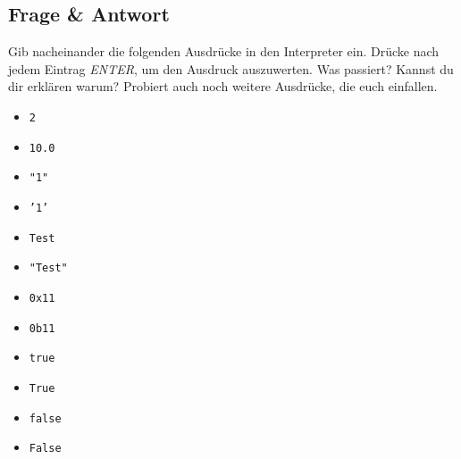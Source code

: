 \subsection{Frage \& Antwort}

Gib nacheinander die folgenden Ausdrücke in den Interpreter ein. Drücke nach
jedem Eintrag \textit{ENTER}, um den Ausdruck auszuwerten. Was passiert?
Kannst du dir erklären warum? Probiert auch noch weitere Ausdrücke, die euch
einfallen.

\begin{multicols}{3}
\begin{itemize}
    \item \texttt{2}
    \item \texttt{10.0}
    \item \texttt{"1"}
    \item \texttt{'1'}
    \item \texttt{Test}
    \item \texttt{"Test"}
    \item \texttt{0x11}
    \item \texttt{0b11}
    \item \texttt{true}
    \item \texttt{True}
    \item \texttt{false}
    \item \texttt{False}
\end{itemize}
\end{multicols}

